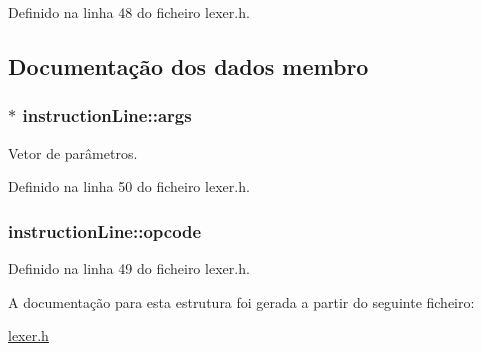 Definido na linha 48 do ficheiro lexer.\-h.



\subsection{Documentação dos dados membro}
\hypertarget{structinstruction_line_ab6b4be43f89da78d09a9469f952435c7}{
\subsubsection[{args}]{$\ast$ instruction\-Line\-::args}}\label{structinstruction_line_ab6b4be43f89da78d09a9469f952435c7}


Vetor de parâmetros. 



Definido na linha 50 do ficheiro lexer.\-h.

\hypertarget{structinstruction_line_a309feca274873683d12f90cf0bd81780}{
\subsubsection[{opcode}]{ instruction\-Line\-::opcode}}\label{structinstruction_line_a309feca274873683d12f90cf0bd81780}


Definido na linha 49 do ficheiro lexer.\-h.



A documentação para esta estrutura foi gerada a partir do seguinte ficheiro\-:\begin{DoxyCompactItemize}
\item 
\hyperlink{lexer_8h}{lexer.\-h}\end{DoxyCompactItemize}
